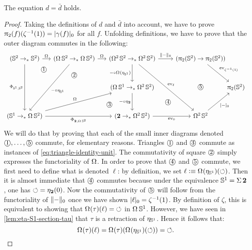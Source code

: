 \documentclass[english,a4paper]{lmcs}
\begin{document}
\begin{prop}
  The equation $d=\bar d$ holds.
  \label{prop:alternative-description-degree}
\end{prop}
\begin{proof}
  Taking the definitions of $d$ and $\bar d$ into account,
  we have to prove $\uppi_{2} (f)({\zeta^{-1}(1)})= \lvert\gamma(f)\rvert_0$ for all $f$.
  Unfolding definitions,
  we have to prove that the outer diagram commutes in the following:
  \begin{displaymath}
    \begin{tikzcd}
      (\Sp \ptdto \Sp) \ar[r,"\loopspace\null"] \ar[dd,"\Phi_{\Sc,\Sp}"{swap}]
      \drar[phantom,"\circled{1}"{description, near start}]
      &[-15pt] (\loopspace \null \Sp \ptdto \loopspace\null\Sp) \ar[r,"\loopspace\null"] \ar[ddl,"\blank\circ\eta_{\Sc}"]
      \dar["\circled{2}", phantom]
      &[-10pt] (\loopspace 2 \Sp \ptdto \loopspace 2 \Sp) \ar[ddr,"\ev_\ell"]
      \ar[r,"\setTrunc\blank"] \dar["\blank\circ \loopspace\null(\eta_{\Sc})"swap]
      & (\hgr 2(\Sp) \to \hgr 2(\Sp)) \drar["\ev_{\inv\zeta(1)}"] \ar[dd,"\circled{5}", phantom] &[-30pt]
      \\[10pt]
      & {} \drar["\circled{3}"{near end}, phantom]
      & (\loopspace\null\Sc \ptdto \loopspace 2 \Sp) \dar["\blank\circ\eta_{\bn 2}"swap]
      \drar["\circled{4}", phantom] &
      & \hgr 2(\Sp)
      \\[10pt]
      (\Sc \ptdto \loopspace\null\Sp) \ar[rr,"\Phi_{\bn 2,\loopspace\null\Sp}"swap] \ar[urr,"\loopspace\null"] &
      & (\bn 2 \ptdto \loopspace 2 \Sp) \rar["\ev_0"swap] & \loopspace 2 \Sp \urar["\settrunc\blank"swap] &
    \end{tikzcd}
  \end{displaymath}
  We will do that by proving that each of the small inner diagrams
  denoted $\textrm{\textcircled{\small 1}},\dots,\textrm{\textcircled{\small 5}}$ commute, for elementary
  reasons. Triangles $\textrm{\textcircled{\small 1}}$ and $\textrm{\textcircled{\small 3}}$ commute as
  instances of \cref{eq:triangle-identity-unit}. The commutativity of
  square $\textrm{\textcircled{\small 2}}$ simply expresses the functoriality of
  $\loopspace\null$. In order to prove that $\textrm{\textcircled{\small 4}}$ and
  $\textrm{\textcircled{\small 5}}$ commute, we first need to define what is denoted
  $\ell$: by definition, we set
  $\ell \defequi \loopspace\null (\eta_\Sc)(\Sloop)$.  Then it is
  almost immediate that $\textrm{\textcircled{\small 4}}$ commutes because under the
  equivalence ${{\mathbb S^{1}}} = \operatorname{\Sigma} {\mathbf{2}}$, one has
  $\mathord{\circlearrowleft} = \eta_{\mathbf{2}}(0)$.  Now the commutativity of $\textrm{\textcircled{\small 5}}$
  will follow from the functoriality of $\lVert\mathord{{-}}\rVert_0$ once we have
  shown $\lvert\ell\rvert_0 = \zeta^{-1}(1)$. By definition of $\zeta$,
  this is equivalent to showing that
  $\loopspace\null(\tau) (\ell) = \Sloop$ in $\loopspace\null
  \Sc$. However, we have seen in \cref{lem:eta-S1-section-tau} that
  $\tau$ is a retraction of $\eta_{{{\mathbb S^{1}}}}$. Hence it follows that:
  \begin{displaymath}
    \loopspace\null(\tau)(\ell) = \loopspace\null(\tau)(\loopspace\null(\eta_\Sc)(\Sloop)) = \Sloop.\qedhere
  \end{displaymath}
\end{proof}
\end{document}
